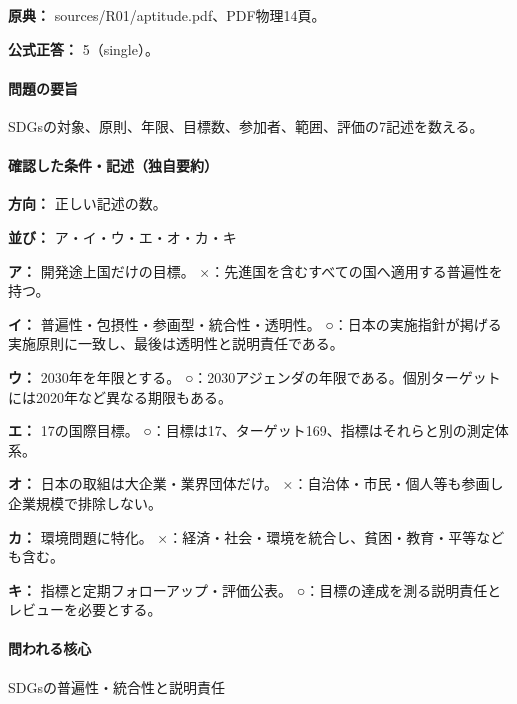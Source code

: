 \noindent\textbf{原典：} sources/R01/aptitude.pdf、PDF物理14頁。

\textbf{公式正答：} 5（single）。

\paragraph{問題の要旨} SDGsの対象、原則、年限、目標数、参加者、範囲、評価の7記述を数える。

\paragraph{確認した条件・記述（独自要約）}\mbox{}\par

\noindent\textbf{方向：} 正しい記述の数。\par

\noindent\textbf{並び：} ア・イ・ウ・エ・オ・カ・キ\par

\noindent\textbf{ア：} 開発途上国だけの目標。 ×：先進国を含むすべての国へ適用する普遍性を持つ。\par

\noindent\textbf{イ：} 普遍性・包摂性・参画型・統合性・透明性。 ○：日本の実施指針が掲げる実施原則に一致し、最後は透明性と説明責任である。\par

\noindent\textbf{ウ：} 2030年を年限とする。 ○：2030アジェンダの年限である。個別ターゲットには2020年など異なる期限もある。\par

\noindent\textbf{エ：} 17の国際目標。 ○：目標は17、ターゲット169、指標はそれらと別の測定体系。\par

\noindent\textbf{オ：} 日本の取組は大企業・業界団体だけ。 ×：自治体・市民・個人等も参画し企業規模で排除しない。\par

\noindent\textbf{カ：} 環境問題に特化。 ×：経済・社会・環境を統合し、貧困・教育・平等なども含む。\par

\noindent\textbf{キ：} 指標と定期フォローアップ・評価公表。 ○：目標の達成を測る説明責任とレビューを必要とする。\par

\paragraph{問われる核心} SDGsの普遍性・統合性と説明責任

